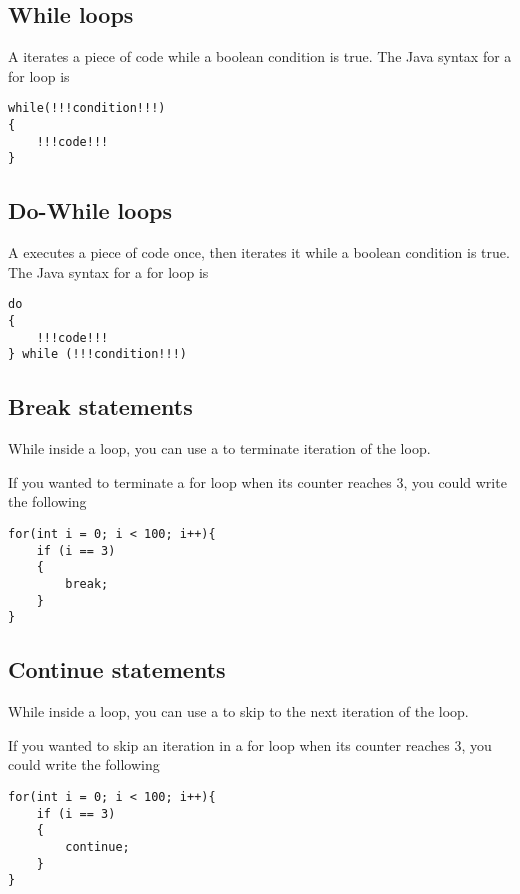 \documentclass[11pt]{article}
\begin{document}
\subsection{While loops}
A  iterates a piece of code while a boolean condition is true. The Java syntax for a for loop is
\vspace{-20pt}
\begin{lstlisting}[style=javaSyntax]
while(!!!condition!!!)
{
    !!!code!!!
}
\end{lstlisting}
\subsection{Do-While loops}
A  executes a piece of code once, then iterates it while a boolean condition is true. The Java syntax for a for loop is
\vspace{-20pt}
\begin{lstlisting}[style=javaSyntax]
do
{
    !!!code!!!
} while (!!!condition!!!)
\end{lstlisting}

\subsection{Break statements}
While inside a loop, you can use a  to terminate iteration of the loop.
\begin{eg} If you wanted to terminate a for loop when its counter reaches 3, you could write the following
\vspace{-15pt}
\begin{lstlisting}
for(int i = 0; i < 100; i++){
    if (i == 3)
    {
        break;
    }
}
\end{lstlisting}
\end{eg}

\subsection{Continue statements}
While inside a loop, you can use a  to skip to the next iteration of the loop.
\begin{eg} If you wanted to skip an iteration in a for loop when its counter reaches 3, you could write the following
\vspace{-15pt}
\begin{lstlisting}
for(int i = 0; i < 100; i++){
    if (i == 3)
    {
        continue;
    }
}
\end{lstlisting}
\end{eg}
\pagebreak
\end{document}
